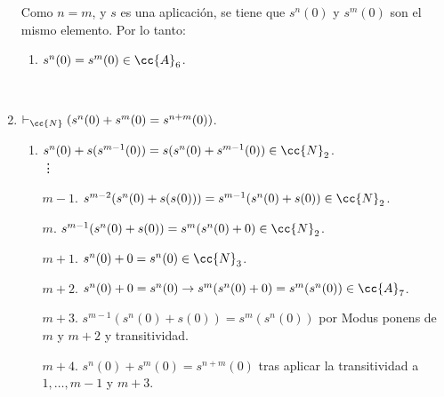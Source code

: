 \begin{ejercicio}
\begin{enumerate}
        Como $n=m$, y $s$ es una aplicación, se tiene que $s^n(0)$ y $s^m(0)$ son el mismo elemento. Por lo tanto:
        \begin{enumerate}[label=\arabic*.]
            \item $s^n(0) = s^m(0)\in \cc{A}_6$.
        \end{enumerate}~
        \item $\vdash_{\cc{N}} (s^n(0) + s^m(0) = s^{n+m}(0))$.
        \begin{enumerate}[label=\arabic*.]
            \item $s^{n}(0)+ s(s^{m-1}(0)) = s(s^{n}(0)+s^{m-1}(0))\in \cc{N}_2$.\\
            \vdots
            \item[$m-1$.] $s^{m-2}(s^{n}(0)+s(s(0))) = s^{m-1}(s^{n}(0)+s(0))\in \cc{N}_2$.
            \item[$m$.] $s^{m-1}(s^{n}(0)+s(0))=s^{m}(s^{n}(0)+0)\in \cc{N}_2$.
            \item[$m+1$.] $s^{n}(0)+0=s^n(0)\in \cc{N}_3$.
            \item[$m+2$.] $s^{n}(0)+0=s^n(0) \to s^{m}(s^{n}(0)+0)=s^m(s^n(0))\in \cc{A}_7$.
            \item[$m+3$.] $s^{m-1}(s^{n}(0)+s(0))=s^{m}(s^{n}(0))$ por Modus ponens de $m$ y $m+2$ y transitividad.
            \item[$m+4$.] $s^n(0) + s^m(0) = s^{n+m}(0)$ tras aplicar la transitividad a $1,\dots,m-1$ y $m+3$.
        \end{enumerate}
    \end{enumerate}
\end{ejercicio}

